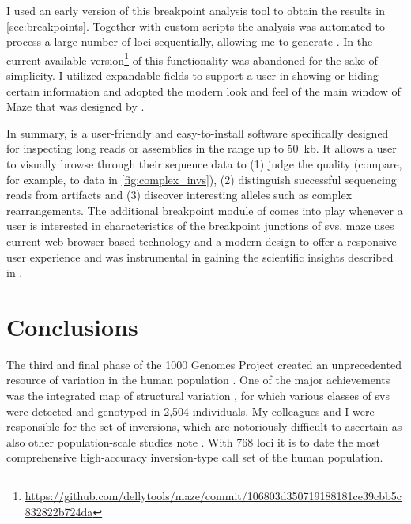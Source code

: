 I used an early version of this breakpoint analysis tool to obtain the results
in \cref{sec:breakpoints}. Together with custom scripts the analysis was
automated to process a large number of loci sequentially, allowing me to
generate .
In the current available version\footnote{\url{https://github.com/dellytools/maze/commit/106803d350719188181ce39cbb5c832822b724da}}
of \maze this functionality was abandoned for the sake of simplicity. I utilized
expandable fields to support a user in showing or hiding certain information and
adopted the modern look and feel of the main window of Maze that was designed by
\markus.

In summary, \maze is a user-friendly and easy-to-install software specifically
designed for inspecting long reads or assemblies in the range up to 50~kb. It
allows a user to visually browse through their sequence data to (1) judge the
quality (compare, for example, \pacbio to \minion data in \cref{fig:complex_invs}),
(2) distinguish successful sequencing reads from artifacts and (3) discover
interesting alleles such as complex rearrangements. The additional breakpoint
module of \maze comes into play whenever a user is interested in characteristics
of the breakpoint junctions of \acp{sv}. \Ac{maze} uses current web browser-based
technology and a modern design to offer a responsive user experience and was
instrumental in gaining the scientific insights described in
.








\section{Conclusions}

The third and final phase of the 1000 Genomes Project created an unprecedented
resource of variation in the human population \citep{Auton2015}. One of the
major achievements was the integrated map of structural variation
\citep{Sudmant2015}, for which various classes of \acp{sv} were detected and
genotyped in 2,504 individuals. My colleagues and I were responsible for the
set of inversions, which are notoriously difficult to ascertain as also other
population-scale studies note \citep{Kidd2008,Hehir-Kwa2016}. With 768 loci it
is to date the most comprehensive high-accuracy inversion-type call set of the
human population.

